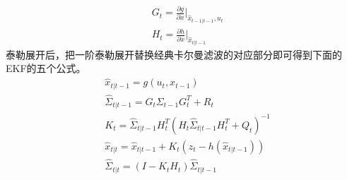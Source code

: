 \documentclass[UTF8,a4paper,10pt]{ctexart}
\begin{document}
\begin{align}
&G_t=\frac{\partial{g}}{\partial{x}}|_{\hat{x}_{t-1|t-1},u_t}\\
&H_t=\frac{\partial{h}}{\partial{x}}|_{\hat{x}_{t|t-1}}
\end{align}
泰勒展开后，把一阶泰勒展开替换经典卡尔曼滤波的对应部分即可得到下面的EKF的五个公式。
\begin{align}
& \hat{x}_{t|t-1}=g(u_t,x_{t-1})\\
& \hat{\Sigma}_{t|t-1}=G_t\Sigma_{t-1}G_t^T+R_t\\
& K_t=\hat{\Sigma}_{t|t-1}H_t^T(H_t\hat{\Sigma}_{t|t-1}H_t^T+Q_t)^{-1}\\
& \hat{x}_{t|t}=\hat{x}_{t|t-1}+K_t(z_t-h(\hat x_{t|{t-1}}))\\
& \hat{\Sigma}_{t|t}=(I-K_tH_t)\hat{\Sigma}_{t|t-1}
\end{align}
\end{document}
